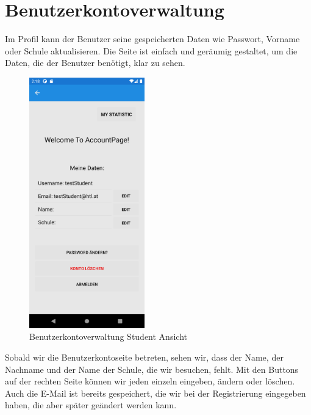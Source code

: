 \section{Benutzerkontoverwaltung}
Im Profil kann der Benutzer seine gespeicherten Daten wie Passwort, Vorname oder
Schule aktualisieren.
Die Seite ist einfach und geräumig gestaltet, um die Daten, die der Benutzer benötigt, klar zu sehen.
\vspace{2cm}
\begin{figure}[h]
    \begin{center}
        \includegraphics*[width=5cm]{pics/Xamarin Student/13 My Acc.png}
        \caption[MyAccount Ansicht]{Benutzerkontoverwaltung Student Ansicht}
    \end{center}
\end{figure}
\newpage
Sobald wir die Benutzerkontoseite betreten, sehen wir, dass der Name, der Nachname und der Name der Schule, die wir besuchen, fehlt. Mit den Buttons auf der rechten Seite können wir jeden einzeln eingeben, ändern oder löschen. Auch die E-Mail ist bereits gespeichert, die wir bei der Registrierung eingegeben haben, die aber später geändert werden kann.
\newline
